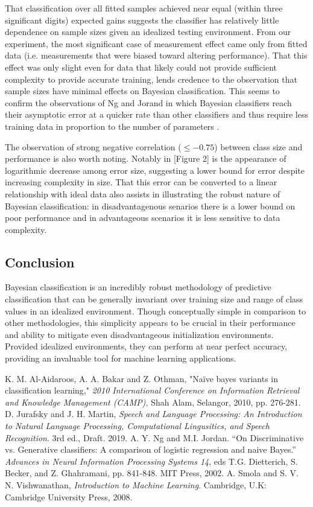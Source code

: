 \documentclass[10pt, conference]{IEEEtran}
\begin{document}
That classification over all fitted samples achieved near equal (within three significant digits) expected gains suggests the classifier has relatively little dependence on sample sizes given an idealized testing environment. From our experiment, the most significant case of measurement effect came only from fitted data (i.e. measurements that were biased toward altering performance). That this effect was only slight even for data that likely could not provide sufficient complexity to provide accurate training, lends credence to the observation that sample sizes have minimal effects on Bayesian classification. This seems to confirm the observations of Ng and Jorand in which Bayesian classifiers reach their asymptotic error at a quicker rate than other classifiers and thus require less training data in proportion to the number of parameters \cite{b3}.

The observation of strong negative correlation ($\leq-0.75$) between class size and performance is also worth noting. Notably in [Figure 2] is the appearance of logarithmic decrease among error size, suggesting a lower bound for error despite increasing complexity in size. That this error can be converted to a linear relationship with ideal data also assists in illustrating the robust nature of Bayesian classification: in disadvantagenous senarios there is a lower bound on poor performance and in advantageous scenarios it is less sensitive to data complexity. 
\subsection{Conclusion}
Bayesian classification is an incredibly robust methodology of predictive classification that can be generally invariant over training size and range of class values in an idealized environment. Though conceptually simple in comparison to other methodologies, this simplicity appears to be crucial in their performance and ability to mitigate even disadvantageous initialization environments. Provided idealized environments, they can perform at near perfect accuracy, providing an invaluable tool for machine learning applications.
\begin{thebibliography}{00}
K. M. Al-Aidaroos, A. A. Bakar and Z. Othman, "Naïve bayes variants in classification learning," \textit{2010 International Conference on Information Retrieval and Knowledge Management (CAMP)}, Shah Alam, Selangor, 2010, pp. 276-281.
 D. Jurafsky and J. H. Martin, \textit{Speech and Language Processing: An Introduction to Natural Language Processing, Computational Lingusitics, and Speech Recognition}. 3rd ed., Draft. 2019.
 A. Y. Ng and M.I. Jordan. ``On Discriminative vs. Generative classifiers: A comparison of logistic regression and naive Bayes.'' \textit{Advances in Neural Information Processing Systems 14}, eds T.G. Dietterich, S. Becker, and Z. Ghahramani, pp. 841-848. MIT Press, 2002.
 A. Smola and S. V. N. Vishwanathan, \textit{Introduction to Machine Learning}. Cambridge, U.K: Cambridge University Press, 2008.
\end{thebibliography}
\end{document}

